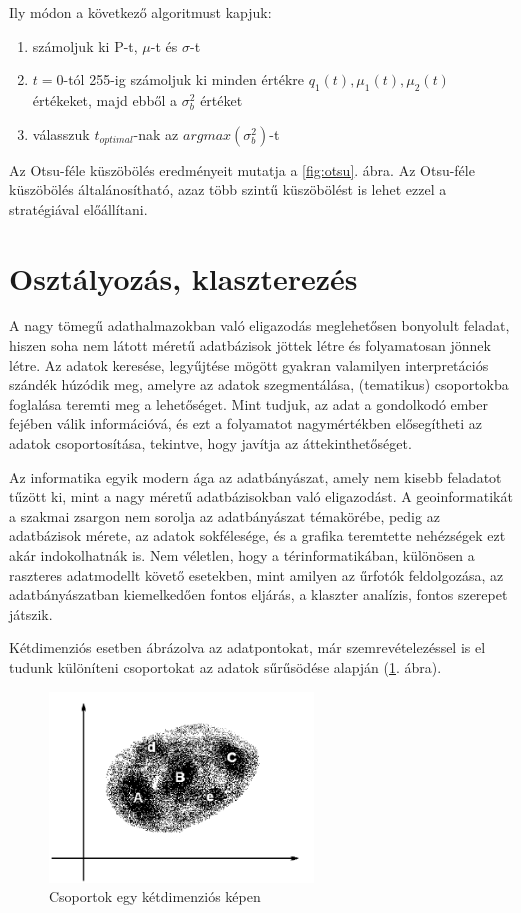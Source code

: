 \documentclass[a4paper,12pt]{article}
\begin{document}
Ily módon a következő algoritmust kapjuk:

\begin{enumerate}
	\item számoljuk ki P-t, $\mu$-t és $\sigma$-t
	\item $t=0$-tól 255-ig számoljuk ki minden értékre $q_1(t), \mu_1(t), \mu_2(t)$
	értékeket, majd ebből a $\sigma_b^2$ értéket
	\item válasszuk $t_{optimal}$-nak az $argmax(\sigma_b^2)$-t
\end{enumerate}

Az Otsu-féle küszöbölés eredményeit mutatja a \ref{fig:otsu}. ábra. Az Otsu-féle
küszöbölés általánosítható, azaz több szintű küszöbölést is lehet ezzel a
stratégiával előállítani.
  
  
  
\section{Osztályozás, klaszterezés}  \label{classifiction_desc}

A nagy tömegű adathalmazokban való eligazodás meglehetősen bonyolult feladat, hiszen soha nem látott méretű adatbázisok jöttek létre és folyamatosan jönnek létre. Az adatok keresése, legyűjtése mögött gyakran valamilyen interpretációs szándék húzódik meg, amelyre az adatok szegmentálása, (tematikus) csoportokba foglalása teremti meg a lehetőséget. Mint tudjuk, az adat a gondolkodó ember fejében válik információvá, és ezt a folyamatot nagymértékben elősegítheti az adatok csoportosítása, tekintve, hogy javítja az áttekinthetőséget.
	
Az informatika egyik modern ága az adatbányászat, amely nem kisebb feladatot tűzött ki, mint a nagy méretű adatbázisokban való eligazodást. A geoinformatikát a szakmai zsargon nem sorolja az adatbányászat témakörébe, pedig az adatbázisok mérete, az adatok sokfélesége, és a grafika teremtette nehézségek ezt akár indokolhatnák is. Nem véletlen, hogy a térinformatikában, különösen a raszteres adatmodellt követő esetekben, mint amilyen az űrfotók feldolgozása, az adatbányászatban kiemelkedően fontos eljárás, a klaszter analízis, fontos szerepet játszik.

Kétdimenziós esetben ábrázolva az adatpontokat, már szemrevételezéssel is el tudunk különíteni csoportokat az adatok sűrűsödése alapján (\ref{fig:klasszt1}. ábra).

\begin{figure}
	\centering
	\includegraphics[width=7cm]{klaszt1.png}
	\caption{Csoportok egy kétdimenziós képen}
	\label{fig:klasszt1}
\end{figure}
\end{document}
